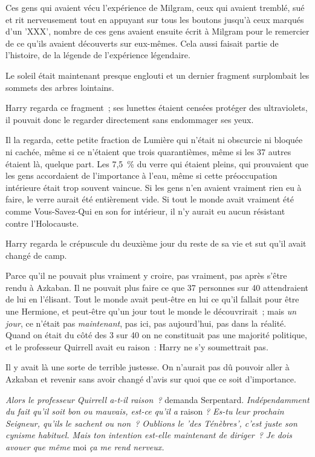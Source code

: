 Ces gens qui avaient vécu l'expérience de Milgram, ceux qui avaient tremblé, sué et rit nerveusement tout en appuyant sur tous les boutons jusqu'à ceux marqués d'un 'XXX', nombre de ces gens avaient ensuite écrit à Milgram pour le remercier de ce qu'ils avaient découverts sur eux-mêmes. Cela aussi faisait partie de l'histoire, de la légende de l'expérience légendaire.

Le soleil était maintenant presque englouti et un dernier fragment surplombait les sommets des arbres lointains.

Harry regarda ce fragment~; ses lunettes étaient censées protéger des ultraviolets, il pouvait donc le regarder directement sans endommager ses yeux.

Il la regarda, cette petite fraction de Lumière qui n'était ni obscurcie ni bloquée ni cachée, même si ce n'étaient que trois quarantièmes, même si les 37 autres étaient là, quelque part. Les 7,5~\% du verre qui étaient pleins, qui prouvaient que les gens accordaient de l'importance à l'eau, même si cette préoccupation intérieure était trop souvent vaincue. Si les gens n'en avaient vraiment rien eu à faire, le verre aurait été entièrement vide. Si tout le monde avait vraiment été comme Vous-Savez-Qui en son for intérieur, il n'y aurait eu aucun résistant contre l'Holocauste.

Harry regarda le crépuscule du deuxième jour du reste de sa vie et sut qu'il avait changé de camp.

Parce qu'il ne pouvait plus vraiment y croire, pas vraiment, pas après s'être rendu à Azkaban. Il ne pouvait plus faire ce que 37 personnes sur 40 attendraient de lui en l'élisant. Tout le monde avait peut-être en lui ce qu'il fallait pour être une Hermione, et peut-être qu'un jour tout le monde le découvrirait~; mais \emph{un jour}, ce n'était pas \emph{maintenant}, pas ici, pas aujourd'hui, pas dans la réalité. Quand on était du côté des 3 sur 40 on ne constituait pas une majorité politique, et le professeur Quirrell avait eu raison~: Harry ne s'y soumettrait pas.

Il y avait là une sorte de terrible justesse. On n'aurait pas dû pouvoir aller à Azkaban et revenir sans avoir changé d'avis sur quoi que ce soit d'importance.

\emph{Alors le professeur Quirrell a-t-il raison~?} demanda Serpentard. \emph{Indépendamment du fait qu'il soit bon ou mauvais, est-ce qu'il a} raison \emph{? Es-tu leur prochain Seigneur, qu'ils le sachent ou non~? Oublions le 'des Ténèbres', c'est juste son cynisme habituel. Mais ton intention est-elle maintenant de diriger~? Je dois avouer que même} moi \emph{ça me rend nerveux.}

